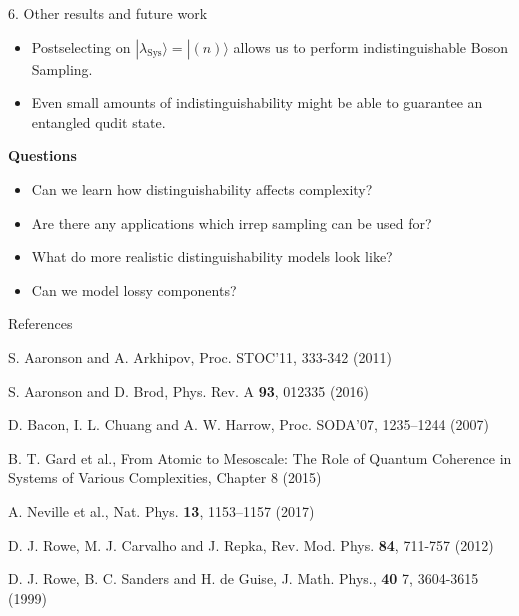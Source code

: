 \documentclass[]{templates/poster}
\begin{document}
\begin{frame}{}
\begin{columns}[t]
\begin{column}{0.422\linewidth}
  \begin{block}{\Large 6. Other results and future work}
  \begin{itemize}
  \item Postselecting on $|\lambda_{\textrm{Sys}}\rangle = |(n)\rangle$ allows us to perform indistinguishable Boson Sampling.
  \item Even small amounts of indistinguishability might be able to guarantee an entangled qudit state.
  \end{itemize}
  \textbf{Questions}
  \begin{itemize}
  \item Can we learn how distinguishability affects complexity?
  \item Are there any applications which irrep sampling can be used for?
  \item What do more realistic distinguishability models look like?
  \item Can we model lossy components?
  \end{itemize}
  \end{block}

  \begin{block}{\Large References}
  
  \noindent [AA11] S. Aaronson and A. Arkhipov, Proc. STOC'11, 333-342 (2011)
  
  \noindent [AB16] S. Aaronson and D. Brod, Phys. Rev. A \textbf{93}, 012335 (2016)

  
  \noindent [BCH07] D. Bacon, I. L. Chuang and A. W. Harrow, Proc. SODA'07, 1235--1244 (2007)
  
  \noindent [GMO+15] B. T. Gard et al., From Atomic to Mesoscale: The Role of Quantum Coherence in Systems of Various Complexities, Chapter 8 (2015)
  
  \noindent [NSC+17] A. Neville et al., Nat. Phys. \textbf{13}, 1153–1157 (2017)
  
  \noindent [RCR12] D. J. Rowe, M. J. Carvalho and J. Repka, Rev. Mod. Phys. \textbf{84}, 711-757 (2012)
   
  \noindent [RSdG99] D. J. Rowe, B. C. Sanders and H. de Guise, J. Math. Phys., \textbf{40} 7, 3604-3615 (1999)
  \end{block}
  \end{column}
\end{columns}

\end{frame}

\end{document}
